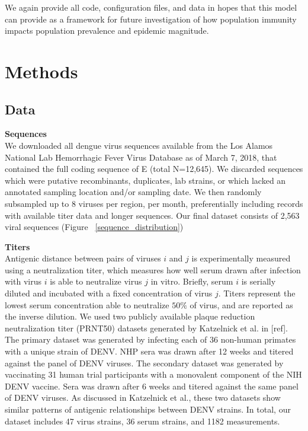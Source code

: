 \documentclass[11pt,oneside,letterpaper]{article}
\def\tbc#1{\textcolor{purple}{[#1]}}
\begin{document}

We again provide all code, configuration files, and data in hopes that this model can provide as a framework for future investigation of how population immunity impacts population prevalence and epidemic magnitude.


\newpage

\section*{Methods}
\subsection*{Data}
\textbf{Sequences}\\
We downloaded all dengue virus sequences available from the Los Alamos National Lab Hemorrhagic Fever Virus Database as of March 7, 2018, that contained the full coding sequence of E (total N=12,645).
We discarded sequences which were putative recombinants, duplicates, lab strains, or which lacked an annotated sampling location and/or sampling date.
We then randomly subsampled up to 8 viruses per region, per month, preferentially including records with available titer data and longer sequences.
Our final dataset consists of 2,563 viral sequences (Figure ~\ref{sequence_distribution})

\textbf{Titers}\\

Antigenic distance between pairs of viruses $i$ and $j$ is experimentally measured using a neutralization titer, which measures how well serum drawn after infection with virus $i$ is able to neutralize virus $j$ in vitro.
Briefly, serum $i$ is serially diluted and incubated with a fixed concentration of virus $j$.
Titers represent the lowest serum concentration able to neutralize $50\%$ of virus, and are reported as the inverse dilution.
We used two publicly available plaque reduction neutralization titer (PRNT50) datasets generated by Katzelnick et al. in {[}ref{]}.
The primary dataset was generated by infecting each of 36 non-human primates with a unique strain of DENV.
NHP sera was drawn after 12 weeks and titered against the panel of DENV viruses.
The secondary dataset was generated by vaccinating 31 human trial participants with a monovalent component of the NIH DENV vaccine.
Sera was drawn after 6 weeks and titered against the same panel of DENV viruses.
As discussed in Katzelnick et al., these two datasets show similar patterns of antigenic relationships between DENV strains.
In total, our dataset includes 47 virus strains, 36 serum strains, and 1182 measurements.
\end{document}
